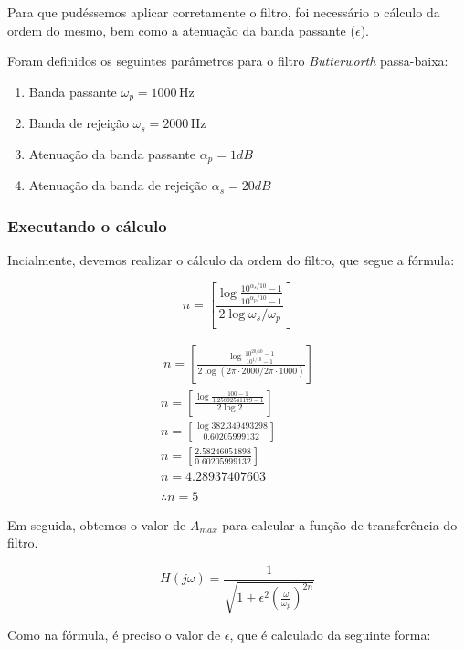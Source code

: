 Para que pudéssemos aplicar corretamente o filtro, foi necessário o cálculo da ordem do mesmo, bem como a atenuação da banda passante ($\epsilon$).

Foram definidos os seguintes parâmetros para o filtro \textit{Butterworth} passa-baixa:

\begin{enumerate}
    \item Banda passante $\omega_p=1000 \, \text{Hz}$
    \item Banda de rejeição $\omega_s = 2000\, \text{Hz}$
    \item Atenuação da banda passante $\alpha_p = 1dB$
    \item Atenuação da banda de rejeição $\alpha_s = 20dB$
\end{enumerate}


\subsubsection*{Executando o cálculo}
Incialmente, devemos realizar o cálculo da ordem do filtro, que segue a fórmula:

$$
    n = \left[ \frac{\log{\frac{10^{\alpha_s/10}- 1}{10^{\alpha_p/10}-1}}}{2\log{\omega_s/\omega_p}} \right]
$$

\begin{align*} \
    n = \left[ \frac{\log{\frac{10^{20/10}- 1}{10^{1/10}-1}}}{2\log{(2\pi \cdot2000/2\pi\cdot 1000)}} \right] \\
    n = \left[ \frac{\log{\frac{100- 1}{1.25892541179-1}}}{2\log{2}} \right]                                  \\
    n = \left[ \frac{\log{382.349493298}}{0.60205999132} \right]                                              \\
    n = \left[ \frac{2.58246051898}{0.60205999132} \right]                                                    \\
    n = 4.28937407603                                                                                         \\
    \\
    \therefore n = 5
\end{align*}


Em seguida, obtemos o valor de $A_{max}$ para calcular a função de transferência do filtro.

$$
    H(j\omega) = \frac{1}{\sqrt{1+\epsilon^2 \left( \frac{\omega}{\omega_p} \right)^{2n}}}
$$

Como na fórmula, é preciso o valor de $\epsilon$, que é calculado da seguinte forma:

